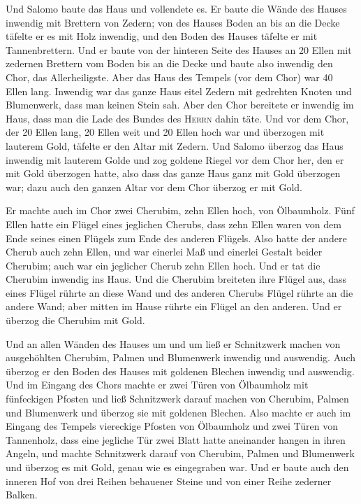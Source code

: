 Und Salomo baute das Haus und vollendete es.
 Er baute die Wände des Hauses inwendig mit Brettern von
Zedern; von des Hauses Boden an bis an die Decke täfelte er es mit Holz
inwendig, und den Boden des Hauses täfelte er mit Tannenbrettern.
 Und er baute von der hinteren Seite des Hauses an 20
Ellen mit zedernen Brettern vom Boden bis an die Decke und baute also
inwendig den Chor, das Allerheiligste.  Aber das Haus des
Tempels (vor dem Chor) war 40 Ellen lang.  Inwendig war
das ganze Haus eitel Zedern mit gedrehten Knoten und Blumenwerk, dass
man keinen Stein sah.  Aber den Chor bereitete er
inwendig im Haus, dass man die Lade des Bundes des \textsc{Herrn} dahin
täte.  Und vor dem Chor, der 20 Ellen lang, 20 Ellen weit
und 20 Ellen hoch war und überzogen mit lauterem Gold, täfelte er den
Altar mit Zedern.  Und Salomo überzog das Haus inwendig
mit lauterem Golde und zog goldene Riegel vor dem Chor her, den er mit
Gold überzogen hatte,  also dass das ganze Haus ganz mit
Gold überzogen war; dazu auch den ganzen Altar vor dem Chor überzog er
mit Gold.

 Er machte auch im Chor zwei Cherubim, zehn Ellen hoch,
von Ölbaumholz.  Fünf Ellen hatte ein Flügel eines
jeglichen Cherubs, dass zehn Ellen waren von dem Ende seines einen
Flügels zum Ende des anderen Flügels.  Also hatte der
andere Cherub auch zehn Ellen, und war einerlei Maß und einerlei Gestalt
beider Cherubim;  auch war ein jeglicher Cherub zehn
Ellen hoch.  Und er tat die Cherubim inwendig ins Haus.
Und die Cherubim breiteten ihre Flügel aus, dass eines Flügel rührte an
diese Wand und des anderen Cherubs Flügel rührte an die andere Wand;
aber mitten im Hause rührte ein Flügel an den anderen. 
Und er überzog die Cherubim mit Gold.

 Und an allen Wänden des Hauses um und um ließ er
Schnitzwerk machen von ausgehöhlten Cherubim, Palmen und Blumenwerk
inwendig und auswendig.  Auch überzog er den Boden des
Hauses mit goldenen Blechen inwendig und auswendig.  Und
im Eingang des Chors machte er zwei Türen von Ölbaumholz mit fünfeckigen
Pfosten  und ließ Schnitzwerk darauf machen von Cherubim,
Palmen und Blumenwerk und überzog sie mit goldenen Blechen.
 Also machte er auch im Eingang des Tempels viereckige
Pfosten von Ölbaumholz  und zwei Türen von Tannenholz,
dass eine jegliche Tür zwei Blatt hatte aneinander hangen in ihren
Angeln,  und machte Schnitzwerk darauf von Cherubim,
Palmen und Blumenwerk und überzog es mit Gold, genau wie es eingegraben
war.  Und er baute auch den inneren Hof von drei Reihen
behauener Steine und von einer Reihe zederner Balken.

